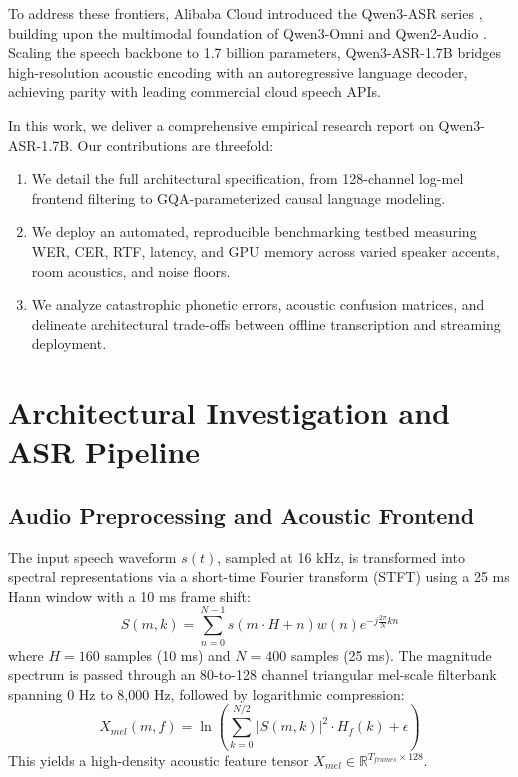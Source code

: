 \documentclass[conference]{IEEEtran}
\begin{document}
To address these frontiers, Alibaba Cloud introduced the Qwen3-ASR series \cite{qwen2025qwen3asr}, building upon the multimodal foundation of Qwen3-Omni and Qwen2-Audio \cite{qwen2024qwen2audio}. Scaling the speech backbone to 1.7 billion parameters, Qwen3-ASR-1.7B bridges high-resolution acoustic encoding with an autoregressive language decoder, achieving parity with leading commercial cloud speech APIs.

In this work, we deliver a comprehensive empirical research report on Qwen3-ASR-1.7B. Our contributions are threefold:
\begin{enumerate}
    \item We detail the full architectural specification, from 128-channel log-mel frontend filtering to GQA-parameterized causal language modeling.
    \item We deploy an automated, reproducible benchmarking testbed measuring WER, CER, RTF, latency, and GPU memory across varied speaker accents, room acoustics, and noise floors.
    \item We analyze catastrophic phonetic errors, acoustic confusion matrices, and delineate architectural trade-offs between offline transcription and streaming deployment.
\end{enumerate}

\section{Architectural Investigation and ASR Pipeline}

\subsection{Audio Preprocessing and Acoustic Frontend}
The input speech waveform $s(t)$, sampled at 16 kHz, is transformed into spectral representations via a short-time Fourier transform (STFT) using a 25 ms Hann window with a 10 ms frame shift:
\begin{equation}
S(m, k) = \sum_{n=0}^{N-1} s(m \cdot H + n) w(n) e^{-j \frac{2\pi}{N} k n}
\end{equation}
where $H = 160$ samples (10 ms) and $N = 400$ samples (25 ms). The magnitude spectrum is passed through an 80-to-128 channel triangular mel-scale filterbank spanning 0 Hz to 8,000 Hz, followed by logarithmic compression:
\begin{equation}
X_{mel}(m, f) = \ln \left( \sum_{k=0}^{N/2} |S(m, k)|^2 \cdot H_f(k) + \epsilon \right)
\end{equation}
This yields a high-density acoustic feature tensor $X_{mel} \in \mathbb{R}^{T_{frames} \times 128}$.
\end{document}
